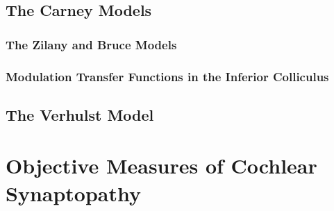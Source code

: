 \subsection{The Carney Models} %
\label{sub:the_carney_models}
\subsubsection{The Zilany and Bruce Models} %
\label{ssub:zilany_and_bruce_2009_2014}

\subsubsection{Modulation Transfer Functions in the Inferior Colliculus} %
\label{ssub:modulation_transfer_functions_in_the_inferior_colliculus}


\subsection{The Verhulst Model} %
\label{sub:the_verhulst_model}



\section{Objective Measures of Cochlear Synaptopathy} %
\label{sec:objective_measures_of_cochlear_synaptopathy}

